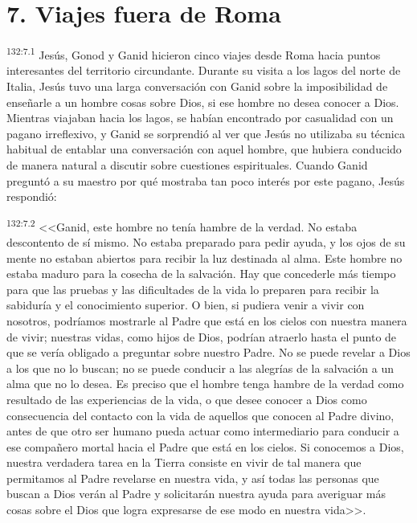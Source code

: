 \section*{7. Viajes fuera de Roma}
\par 
\textsuperscript{132:7.1} Jesús, Gonod y Ganid hicieron cinco viajes desde Roma hacia puntos interesantes del territorio circundante. Durante su visita a los lagos del norte de Italia, Jesús tuvo una larga conversación con Ganid sobre la imposibilidad de enseñarle a un hombre cosas sobre Dios, si ese hombre no desea conocer a Dios. Mientras viajaban hacia los lagos, se habían encontrado por casualidad con un pagano irreflexivo, y Ganid se sorprendió al ver que Jesús no utilizaba su técnica habitual de entablar una conversación con aquel hombre, que hubiera conducido de manera natural a discutir sobre cuestiones espirituales. Cuando Ganid preguntó a su maestro por qué mostraba tan poco interés por este pagano, Jesús respondió:

\par 
\textsuperscript{132:7.2} <<Ganid, este hombre no tenía hambre de la verdad. No estaba descontento de sí mismo. No estaba preparado para pedir ayuda, y los ojos de su mente no estaban abiertos para recibir la luz destinada al alma. Este hombre no estaba maduro para la cosecha de la salvación. Hay que concederle más tiempo para que las pruebas y las dificultades de la vida lo preparen para recibir la sabiduría y el conocimiento superior. O bien, si pudiera venir a vivir con nosotros, podríamos mostrarle al Padre que está en los cielos con nuestra manera de vivir; nuestras vidas, como hijos de Dios, podrían atraerlo hasta el punto de que se vería obligado a preguntar sobre nuestro Padre. No se puede revelar a Dios a los que no lo buscan; no se puede conducir a las alegrías de la salvación a un alma que no lo desea. Es preciso que el hombre tenga hambre de la verdad como resultado de las experiencias de la vida, o que desee conocer a Dios como consecuencia del contacto con la vida de aquellos que conocen al Padre divino, antes de que otro ser humano pueda actuar como intermediario para conducir a ese compañero mortal hacia el Padre que está en los cielos. Si conocemos a Dios, nuestra verdadera tarea en la Tierra consiste en vivir de tal manera que permitamos al Padre revelarse en nuestra vida, y así todas las personas que buscan a Dios verán al Padre y solicitarán nuestra ayuda para averiguar más cosas sobre el Dios que logra expresarse de ese modo en nuestra vida>>.

